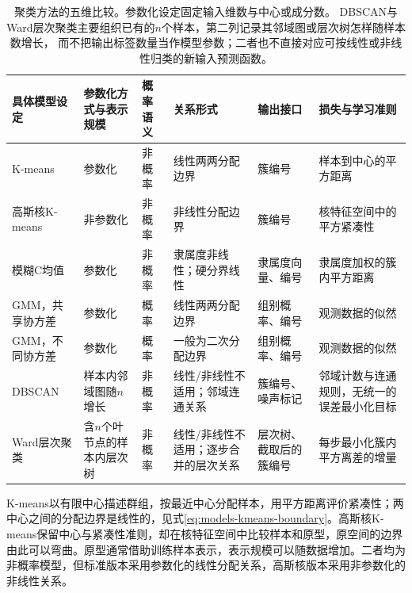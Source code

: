\begin{table}[htbp]
  \centering
  \footnotesize
  \setlength{\tabcolsep}{4pt}
  \renewcommand{\arraystretch}{1.25}
  \begin{tabularx}{\linewidth}{@{}>{\raggedright\arraybackslash}p{28mm}>{\raggedright\arraybackslash}p{16mm}>{\raggedright\arraybackslash}p{11mm}>{\raggedright\arraybackslash}p{23mm}>{\raggedright\arraybackslash}p{22mm}>{\raggedright\arraybackslash}X@{}}
    \toprule
    \textbf{具体模型设定} & \textbf{参数化方式与表示规模} & \textbf{概率语义} & \textbf{关系形式} & \textbf{输出接口} & \textbf{损失与学习准则} \\
    \midrule
    K-means & 参数化 & 非概率 & 线性两两分配边界 & 簇编号 & 样本到中心的平方距离 \\
    高斯核K-means & 非参数化 & 非概率 & 非线性分配边界 & 簇编号 & 核特征空间中的平方紧凑性 \\
    模糊C均值 & 参数化 & 非概率 & 隶属度非线性；硬分界线性 & 隶属度向量、编号 & 隶属度加权的簇内平方距离 \\
    GMM，共享协方差 & 参数化 & 概率 & 线性两两分配边界 & 组别概率、编号 & 观测数据的似然 \\
    GMM，不同协方差 & 参数化 & 概率 & 一般为二次分配边界 & 组别概率、编号 & 观测数据的似然 \\
    DBSCAN & 样本内邻域图随$n$增长 & 非概率 & 线性/非线性不适用；邻域连通关系 & 簇编号、噪声标记 & 邻域计数与连通规则，无统一的误差最小化目标 \\
    Ward层次聚类 & 含$n$个叶节点的样本内层次树 & 非概率 & 线性/非线性不适用；逐步合并的层次关系 & 层次树、截取后的簇编号 & 每步最小化簇内平方离差的增量 \\
    \bottomrule
  \end{tabularx}
  \caption{聚类方法的五维比较。参数化设定固定输入维数与中心或成分数。
  DBSCAN与Ward层次聚类主要组织已有的$n$个样本，第二列记录其邻域图或层次树怎样随样本数增长，
  而不把输出标签数量当作模型参数；二者也不直接对应可按线性或非线性归类的新输入预测函数。}
  \label{tab:models-clusterers}
\end{table}
\FloatBarrier

K-means以有限中心描述群组，按最近中心分配样本，用平方距离评价紧凑性；两中心之间的分配边界是线性的，见式\eqref{eq:models-kmeans-boundary}。高斯核K-means保留中心与紧凑性准则，却在核特征空间中比较样本和原型，原空间的边界由此可以弯曲。原型通常借助训练样本表示，表示规模可以随数据增加。二者均为非概率模型，但标准版本采用参数化的线性分配关系，高斯核版本采用非参数化的非线性关系。

